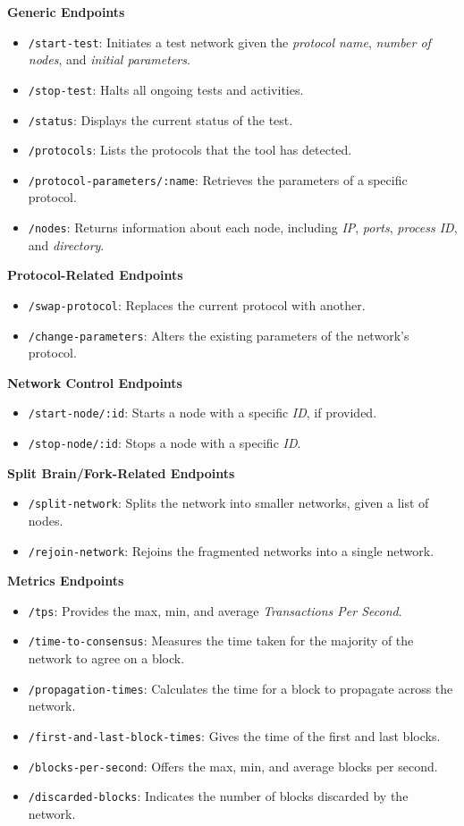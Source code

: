 \textbf{Generic Endpoints}
\begin{itemize}
  \item \texttt{/start-test}: Initiates a test network given the \textit{protocol name}, \textit{number of nodes}, and \textit{initial parameters}.
  \item \texttt{/stop-test}: Halts all ongoing tests and activities.
  \item \texttt{/status}: Displays the current status of the test.
  \item \texttt{/protocols}: Lists the protocols that the tool has detected.
  \item \texttt{/protocol-parameters/:name}: Retrieves the parameters of a specific protocol.
  \item \texttt{/nodes}: Returns information about each node, including \textit{IP}, \textit{ports}, \textit{process ID}, and \textit{directory}.
\end{itemize}

\textbf{Protocol-Related Endpoints}
\begin{itemize}
  \item \texttt{/swap-protocol}: Replaces the current protocol with another.
  \item \texttt{/change-parameters}: Alters the existing parameters of the network's protocol.
\end{itemize}

\textbf{Network Control Endpoints}
\begin{itemize}
  \item \texttt{/start-node/:id}: Starts a node with a specific \textit{ID}, if provided.
  \item \texttt{/stop-node/:id}: Stops a node with a specific \textit{ID}.
\end{itemize}

\textbf{Split Brain/Fork-Related Endpoints}
\begin{itemize}
  \item \texttt{/split-network}: Splits the network into smaller networks, given a list of nodes.
  \item \texttt{/rejoin-network}: Rejoins the fragmented networks into a single network.
\end{itemize}

\textbf{Metrics Endpoints}
\begin{itemize}
  \item \texttt{/tps}: Provides the max, min, and average \textit{Transactions Per Second}.
  \item \texttt{/time-to-consensus}: Measures the time taken for the majority of the network to agree on a block.
  \item \texttt{/propagation-times}: Calculates the time for a block to propagate across the network.
  \item \texttt{/first-and-last-block-times}: Gives the time of the first and last blocks.
  \item \texttt{/blocks-per-second}: Offers the max, min, and average blocks per second.
  \item \texttt{/discarded-blocks}: Indicates the number of blocks discarded by the network.
\end{itemize}


